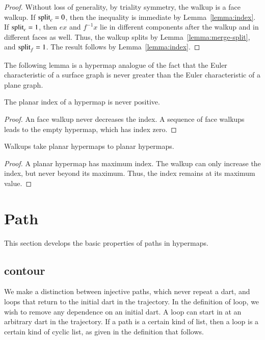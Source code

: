 \begin{proof} Without loss of generality, by triality symmetry, the
walkup is a face walkup.  If ${\operatorname{split}}_c=0$, then the inequality is
immediate by Lemma~\ref{lemma:index}.  If ${\operatorname{split}}_c=1$, 
then $e x$ and $f^{-1} x$ lie in
different components after the walkup and in different
faces as well.  Thus, the walkup splits by Lemma~\ref{lemma:merge-split}, and
  ${\operatorname{split}}_f = 1$.  The result
follows by Lemma~\ref{lemma:index}.
\end{proof}

The following lemma is a hypermap analogue of the fact that the Euler characteristic
of a surface graph is never greater than the Euler characteristic of a plane graph.

\begin{lemma}
\label{lemma:planar-nonpos}  
The planar index
of a hypermap is never positive.
\end{lemma}

\begin{proof}  An face walkup never decreases the index.  A sequence
of face walkups leads to the empty hypermap, which has
index zero.
\end{proof}


\begin{lemma}
\label{lemma:walkup-planar}
Walkups take planar hypermaps to planar
hypermaps.
\end{lemma}

\begin{proof}  
A planar hypermap has maximum index.  The walkup
can only increase the index, but never beyond its maximum.  
Thus, the index remains at its maximum value.
\end{proof}





\section{Path}

This section develops the basic properties of paths in hypermaps.


\subsection{contour}

We make a distinction between injective paths, which never
repeat a dart, and loops that return to the initial dart in the trajectory.
In the definition of loop, we wish to remove any dependence on an initial dart.
A loop can start in at an arbitrary dart in the trajectory.  If a path is a certain
kind of list, then a loop is a certain kind of cyclic list, as given in the
definition that follows.


